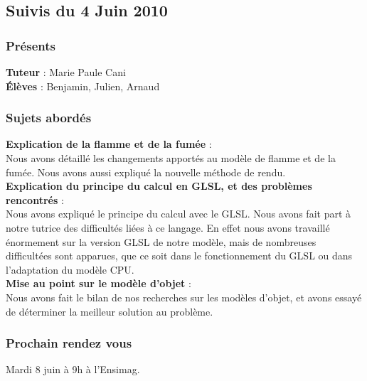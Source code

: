 \documentclass[a4paper,10pt]{article}
\begin{document}
\subsection{Suivis du  4 Juin 2010}
\subsubsection{Présents}
\textbf{Tuteur} : Marie Paule Cani\\
\textbf{Élèves} : Benjamin, Julien, Arnaud \\

\subsubsection{Sujets abordés}

\textbf{Explication de la flamme et de la fumée} :  \\
    Nous avons détaillé les changements apportés au modèle de flamme et de la fumée.
    Nous avons aussi expliqué la nouvelle méthode de rendu.\\
    
\textbf{Explication du principe du calcul en GLSL, et des problèmes rencontrés} :  \\
    Nous avons expliqué le principe du calcul avec le GLSL. Nous avons fait part à notre tutrice des 
    difficultés liées à ce langage. En effet nous avons travaillé énormement sur
    la version GLSL de notre modèle, mais de nombreuses difficultées sont apparues,
    que ce soit dans le fonctionnement du GLSL ou dans l'adaptation du modèle CPU.\\
    
\textbf{Mise au point sur le modèle d'objet} :  \\
    Nous avons fait le bilan de nos recherches sur les modèles d'objet, et avons essayé
    de déterminer la meilleur solution au problème. \\

\subsubsection{Prochain rendez vous}
    Mardi 8 juin à 9h à l'Ensimag.\\








\end{document}
